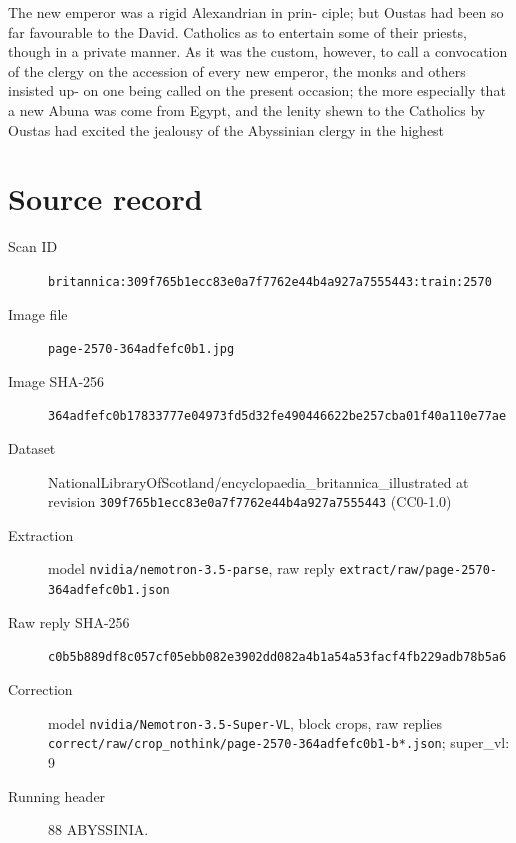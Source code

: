 \documentclass{article}
\begin{document}
The new emperor was a rigid Alexandrian in prin- ciple; but Oustas had been so far favourable to the David. Catholics as to entertain some of their priests, though in a private manner. As it was the custom, however, to call a convocation of the clergy on the accession of every new emperor, the monks and others insisted up- on one being called on the present occasion; the more especially that a new Abuna was come from Egypt, and the lenity shewn to the Catholics by Oustas had excited the jealousy of the Abyssinian clergy in the highest


\section*{Source record}
\begin{description}
\item[Scan ID] \texttt{britannica:309f765b1ecc83e0a7f7762e44b4a927a7555443:train:2570}
\item[Image file] \texttt{page-2570-364adfefc0b1.jpg}
\item[Image SHA-256] \texttt{364adfefc0b17833777e04973fd5d32fe490446622be257cba01f40a110e77ae}
\item[Dataset] NationalLibraryOfScotland/encyclopaedia\_britannica\_illustrated at revision \texttt{309f765b1ecc83e0a7f7762e44b4a927a7555443} (CC0-1.0)
\item[Extraction] model \texttt{nvidia/nemotron-3.5-parse}, raw reply \texttt{extract/raw/page-2570-364adfefc0b1.json}
\item[Raw reply SHA-256] \texttt{c0b5b889df8c057cf05ebb082e3902dd082a4b1a54a53facf4fb229adb78b5a6}
\item[Correction] model \texttt{nvidia/Nemotron-3.5-Super-VL}, block crops, raw replies \texttt{correct/raw/crop\_nothink/page-2570-364adfefc0b1-b*.json}; super\_vl: 9
\item[Running header] 88 ABYSSINIA.
\end{description}
\end{document}
